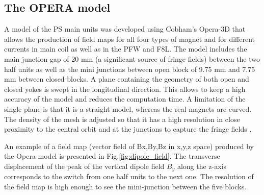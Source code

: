 \documentclass[a4paper,
               biblatex,     %
               keeplastbox,   %
               ]{jacow}
\begin{document}
\subsection{The OPERA model}
A model of the PS main units was developed using Cobham's Opera-3D that allows the production of field maps for all four types of magnet and for different currents in main coil as well as in the PFW and F8L. The model includes the main junction gap of 20 mm (a significant source of fringe fields) between the two half units as well as the mini junctions between open block of 9.75 mm and 7.75 mm between closed blocks. A plane containing the geometry of both open and closed yokes is swept in the longitudinal direction. This allows to keep a high accuracy of the model and reduces the computation time. A limitation of the single plane is that it is a straight model, whereas the real magnets are curved. The density of the mesh is adjusted so that it has a high resolution in close proximity to the central orbit and at the junctions to capture the fringe fields \cite{anglada_reference_2019}.






An example of a field map (vector field of Bx,By,Bz in x,y,z space) produced by the Opera model is presented in Fig.\ref{fig:dipole_field}. The transverse displacement of the peak of the vertical dipole field $B_{y}$ along the z-axis corresponds to the switch from one half units to the next one. The resolution of the field map is high enough to see the mini-junction between the five blocks.
\end{document}
